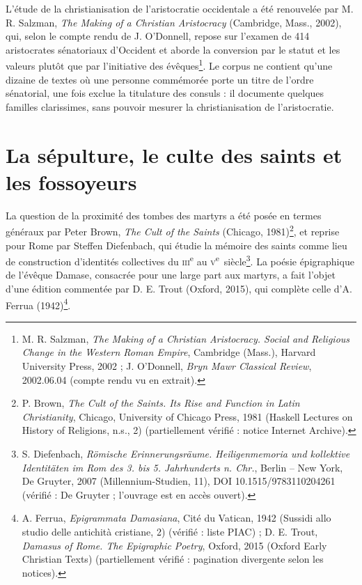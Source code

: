 L’étude de la christianisation de l’aristocratie occidentale a été renouvelée par M. R. Salzman, \emph{The Making of a Christian Aristocracy} (Cambridge, Mass., 2002), qui, selon le compte rendu de J. O’Donnell, repose sur l’examen de 414 aristocrates sénatoriaux d’Occident et aborde la conversion par le statut et les valeurs plutôt que par l’initiative des évêques\footnote{M. R. Salzman, \emph{The Making of a Christian Aristocracy. Social and Religious Change in the Western Roman Empire}, Cambridge (Mass.), Harvard University Press, 2002 ; J. O’Donnell, \emph{Bryn Mawr Classical Review}, 2002.06.04 (compte rendu vu en extrait).}. Le corpus ne contient qu’une dizaine de textes où une personne commémorée porte un titre de l’ordre sénatorial, une fois exclue la titulature des consuls : il documente quelques familles clarissimes, sans pouvoir mesurer la christianisation de l’aristocratie.

\section{La sépulture, le culte des saints et les fossoyeurs}

La question de la proximité des tombes des martyrs a été posée en termes généraux par Peter Brown, \emph{The Cult of the Saints} (Chicago, 1981)\footnote{P. Brown, \emph{The Cult of the Saints. Its Rise and Function in Latin Christianity}, Chicago, University of Chicago Press, 1981 (Haskell Lectures on History of Religions, n.s., 2) (partiellement vérifié : notice Internet Archive).}, et reprise pour Rome par Steffen Diefenbach, qui étudie la mémoire des saints comme lieu de construction d’identités collectives du \textsc{iii}\textsuperscript{e} au \textsc{v}\textsuperscript{e}~siècle\footnote{S. Diefenbach, \emph{Römische Erinnerungsräume. Heiligenmemoria und kollektive Identitäten im Rom des 3. bis 5. Jahrhunderts n. Chr.}, Berlin – New York, De Gruyter, 2007 (Millennium-Studien, 11), DOI 10.1515/9783110204261 (vérifié : De Gruyter ; l’ouvrage est en accès ouvert).}. La poésie épigraphique de l’évêque Damase, consacrée pour une large part aux martyrs, a fait l’objet d’une édition commentée par D. E. Trout (Oxford, 2015), qui complète celle d’A. Ferrua (1942)\footnote{A. Ferrua, \emph{Epigrammata Damasiana}, Cité du Vatican, 1942 (Sussidi allo studio delle antichità cristiane, 2) (vérifié : liste PIAC) ; D. E. Trout, \emph{Damasus of Rome. The Epigraphic Poetry}, Oxford, 2015 (Oxford Early Christian Texts) (partiellement vérifié : pagination divergente selon les notices).}.

